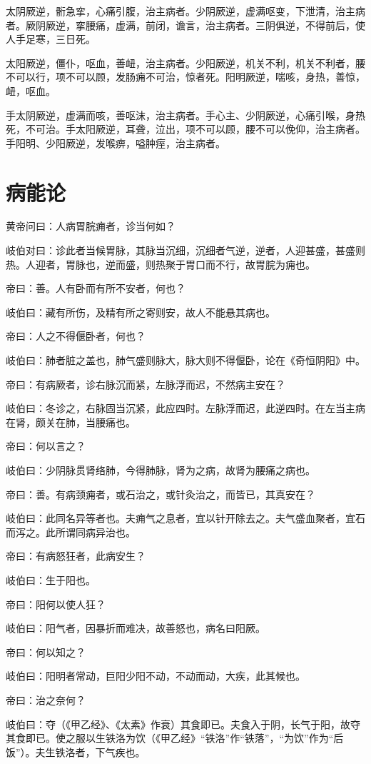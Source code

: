 \documentclass{article}%
\begin{document}
太阴厥逆，䯒急挛，心痛引腹，治主病者。少阴厥逆，虚满呕变，下泄清，治主病者。厥阴厥逆，挛腰痛，虚满，前闭，谵言，治主病者。三阴俱逆，不得前后，使人手足寒，三日死。

太阳厥逆，僵仆，呕血，善衄，治主病者。少阳厥逆，机关不利，机关不利者，腰不可以行，项不可以顾，发肠痈不可治，惊者死。阳明厥逆，喘咳，身热，善惊，衄，呕血。

手太阴厥逆，虚满而咳，善呕沫，治主病者。手心主、少阴厥逆，心痛引喉，身热死，不可治。手太阳厥逆，耳聋，泣出，项不可以顾，腰不可以俛仰，治主病者。手阳明、少阳厥逆，发喉痹，嗌肿痓，治主病者。
\section{病能论}
黄帝问曰：人病胃脘痈者，诊当何如？

岐伯对曰：诊此者当候胃脉，其脉当沉细，沉细者气逆，逆者，人迎甚盛，甚盛则热。人迎者，胃脉也，逆而盛，则热聚于胃口而不行，故胃脘为痈也。

帝曰：善。人有卧而有所不安者，何也？

岐伯曰：藏有所伤，及精有所之寄则安，故人不能悬其病也。

帝曰：人之不得偃卧者，何也？

岐伯曰：肺者脏之盖也，肺气盛则脉大，脉大则不得偃卧，论在《奇恒阴阳》中。

帝曰：有病厥者，诊右脉沉而紧，左脉浮而迟，不然病主安在？

岐伯曰：冬诊之，右脉固当沉紧，此应四时。左脉浮而迟，此逆四时。在左当主病在肾，颇关在肺，当腰痛也。

帝曰：何以言之？

岐伯曰：少阴脉贯肾络肺，今得肺脉，肾为之病，故肾为腰痛之病也。

帝曰：善。有病颈痈者，或石治之，或针灸治之，而皆已，其真安在？

岐伯曰：此同名异等者也。夫痈气之息者，宜以针开除去之。夫气盛血聚者，宜石而泻之。此所谓同病异治也。

帝曰：有病怒狂者，此病安生？

岐伯曰：生于阳也。

帝曰：阳何以使人狂？

岐伯曰：阳气者，因暴折而难决，故善怒也，病名曰阳厥。

帝曰：何以知之？

岐伯曰：阳明者常动，巨阳少阳不动，不动而动，大疾，此其候也。

帝曰：治之奈何？

岐伯曰：夺（《甲乙经》、《太素》作衰）其食即已。夫食入于阴，长气于阳，故夺其食即已。使之服以生铁洛为饮（《甲乙经》“铁洛”作“铁落”，“为饮”作为“后饭”）。夫生铁洛者，下气疾也。
\end{document}
